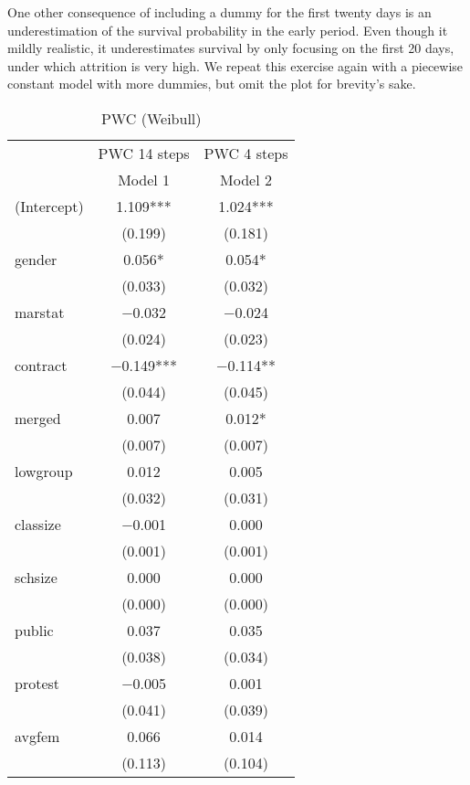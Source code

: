 \documentclass[
]{article}
\begin{document}
One other consequence of including a dummy for the first twenty days is
an underestimation of the survival probability in the early period. Even
though it mildly realistic, it underestimates survival by only focusing
on the first 20 days, under which attrition is very high. We repeat this
exercise again with a piecewise constant model with more dummies, but
omit the plot for brevity's sake.

\begin{table}[!h]

\caption{\label{tab:unnamed-chunk-17}PWC (Weibull)}
\centering
\fontsize{8}{10}\selectfont
\begin{tabular}[t]{lcc}
\toprule
\multicolumn{1}{c}{ } & \multicolumn{1}{c}{PWC 14 steps} & \multicolumn{1}{c}{PWC 4 steps} \\
\cmidrule(l{3pt}r{3pt}){2-2} \cmidrule(l{3pt}r{3pt}){3-3}
  & Model 1 & Model 2\\
\midrule
(Intercept) & \num{1.109}*** & \num{1.024}***\\
 & (\num{0.199}) & (\num{0.181})\\
gender & \num{0.056}* & \num{0.054}*\\
 & (\num{0.033}) & (\num{0.032})\\
marstat & \num{-0.032} & \num{-0.024}\\
 & (\num{0.024}) & (\num{0.023})\\
contract & \num{-0.149}*** & \num{-0.114}**\\
 & (\num{0.044}) & (\num{0.045})\\
merged & \num{0.007} & \num{0.012}*\\
 & (\num{0.007}) & (\num{0.007})\\
lowgroup & \num{0.012} & \num{0.005}\\
 & (\num{0.032}) & (\num{0.031})\\
classize & \num{-0.001} & \num{0.000}\\
 & (\num{0.001}) & (\num{0.001})\\
schsize & \num{0.000} & \num{0.000}\\
 & (\num{0.000}) & (\num{0.000})\\
public & \num{0.037} & \num{0.035}\\
 & (\num{0.038}) & (\num{0.034})\\
protest & \num{-0.005} & \num{0.001}\\
 & (\num{0.041}) & (\num{0.039})\\
avgfem & \num{0.066} & \num{0.014}\\
 & (\num{0.113}) & (\num{0.104})\\

\end{tabular}
\end{table}
\end{document}
